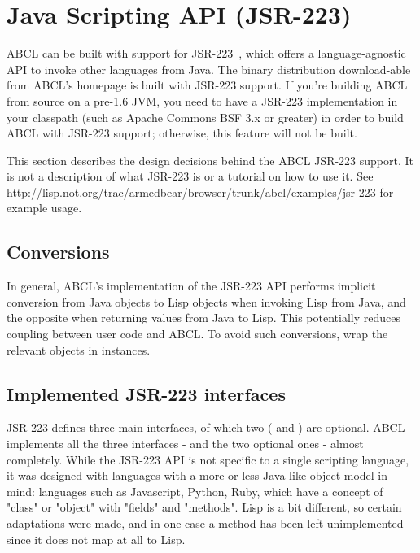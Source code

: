 \documentclass[10pt]{book}
\begin{document}
\section{Java Scripting API (JSR-223)}
\label{sec:java-scripting-api}

ABCL can be built with support for JSR-223~\cite{jsr-223}, which offers
a language-agnostic API to invoke other languages from Java. The binary
distribution download-able from ABCL's homepage is built with JSR-223
support. If you're building ABCL from source on a pre-1.6 JVM, you need
to have a JSR-223 implementation in your classpath (such as Apache
Commons BSF 3.x or greater) in order to build ABCL with JSR-223 support;
otherwise, this feature will not be built.

This section describes the design decisions behind the ABCL JSR-223
support. It is not a description of what JSR-223 is or a tutorial on
how to use it. See
\url{http://lisp.not.org/trac/armedbear/browser/trunk/abcl/examples/jsr-223}
for example usage.

\subsection{Conversions}

In general, ABCL's implementation of the JSR-223 API performs implicit
conversion from Java objects to Lisp objects when invoking Lisp from
Java, and the opposite when returning values from Java to Lisp. This
potentially reduces coupling between user code and ABCL. To avoid such
conversions, wrap the relevant objects in  instances.

\subsection{Implemented JSR-223 interfaces}

JSR-223 defines three main interfaces, of which two (
and ) are optional. ABCL implements all the three
interfaces -  and the two optional ones - almost
completely. While the JSR-223 API is not specific to a single scripting
language, it was designed with languages with a more or less Java-like
object model in mind: languages such as Javascript, Python, Ruby, which
have a concept of "class" or "object" with "fields" and "methods". Lisp
is a bit different, so certain adaptations were made, and in one case a
method has been left unimplemented since it does not map at all to Lisp.
\end{document}
